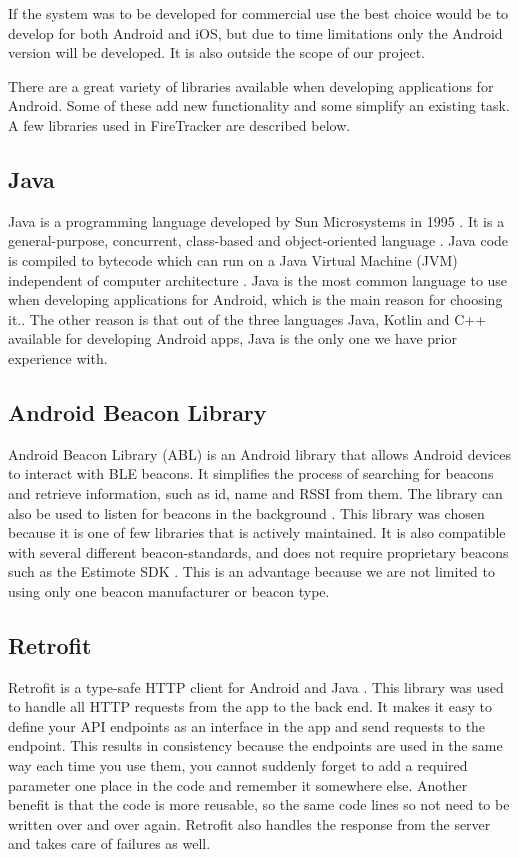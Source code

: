 \documentclass[../Main/thesis.tex]{subfiles}
\begin{document}
If the system was to be developed for commercial use the best choice would be to develop for both Android and iOS, but due to time limitations only the Android version will be developed. 
It is also outside the scope of our project.

There are a great variety of libraries available when developing applications for Android.
Some of these add new functionality and some simplify an existing task.
A few libraries used in FireTracker are described below. 

\subsection{Java}
Java is a programming language developed by Sun Microsystems in 1995 \citep{SunMicrosystems1996}. 
It is a general-purpose, concurrent, class-based and object-oriented language \citep[p. 1]{Gosling2018}.
Java code is compiled to bytecode which can run on a Java Virtual Machine (JVM) independent of computer architecture \citep{Venners2000}. 
Java is the most common language to use when developing applications for Android, which is the main reason for choosing it..
The other reason is that out of the three languages Java, Kotlin and C++ \citep{Google2018b} available for developing Android apps, Java is the only one we have prior experience with.


\subsection{Android Beacon Library}
Android Beacon Library (ABL) is an Android library that allows Android devices to interact with BLE beacons. 
It simplifies the process of searching for beacons and retrieve information, such as id, name and RSSI from them.
The library can also be used to listen for beacons in the background \citep{RadiusNetwork2015}.
This library was chosen because it is one of few libraries that is actively maintained.
It is also compatible with several different beacon-standards, and does not require proprietary beacons such as the Estimote SDK \citep{Estimote2017}.
This is an advantage because we are not limited to using only one beacon manufacturer or beacon type.

\subsection{Retrofit}
Retrofit is a type-safe HTTP client for Android and Java \citep{SquareInc.2017}.
This library was used to handle all HTTP requests from the app to the back end. 
It makes it easy to define your API endpoints as an interface in the app and send requests to the endpoint.
This results in consistency because the endpoints are used in the same way each time you use them, you cannot suddenly forget to add a required parameter one place in the code and remember it somewhere else.
Another benefit is that the code is more reusable, so the same code lines so not need to be written over and over again.
Retrofit also handles the response from the server and takes care of failures as well.
\end{document}
